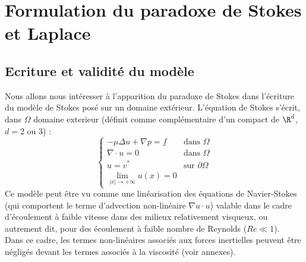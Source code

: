 \chapter{Formulation du paradoxe de Stokes et Laplace}

\section{Ecriture et validité du modèle}


Nous allons nous intéresser à l'apparition du paradoxe de Stokes dans l'écriture du modèle de Stokes posé sur un domaine extérieur.
L'équation de Stokes s'écrit, dans $\Omega$ domaine exterieur (définit comme complémentaire d'un compact de $\R^d$, $d = 2 \text{ ou } 3$) :
$$\begin{cases}
    - \mu \Delta u + \nabla p = f &\text{dans } \Omega \\
    \nabla \cdot u = 0 &\text{dans } \Omega \\
    u = v^* &\text{sur } \partial \Omega \\
    \underset{|x| \to +\infty}{\lim}u(x) = 0
\end{cases}$$
Ce modèle peut être vu comme une linéarisation des équations de Navier-Stokes (qui comportent le terme d'advection non-linéaire $\nabla u \cdot u$) valable dans le cadre d'écoulement à faible vitesse dans des milieux relativement visqueux, ou autrement dit, pour des écoulement à faible nombre de Reynolds ($Re \ll 1$). \\
Dans ce cadre, les termes non-linéaires associés aux forces inertielles peuvent être négligés devant les termes associés à la viscosité (voir annexes).

\vspace{1em}

